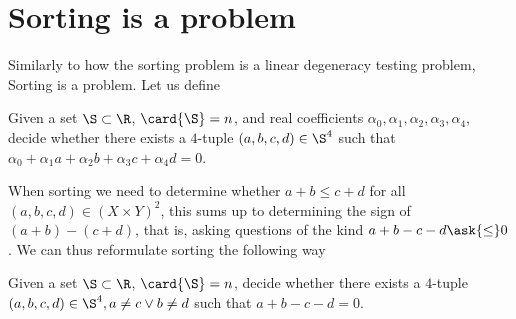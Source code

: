 \section{Sorting \XY is a \fourLDT problem}
\label{tree:related:xy4ldt}

Similarly to how the sorting problem is a linear degeneracy testing problem,
Sorting \XY is a \fourLDT problem. Let us define \fourLDT
\begin{problem}[\fourLDT]
Given a set $\S \subset \R$, $\card{\S} = n$, and real coefficients $\alpha_0,
\alpha_1, \alpha_2, \alpha_3, \alpha_4$, decide whether there exists a
\(4\)-tuple \((a,b,c,d) \in \S^4\) such that
$\alpha_0 + \alpha_1 a + \alpha_2 b + \alpha_3 c + \alpha_4 d = 0$.
\end{problem}

When sorting \XY we need to determine whether $a + b \le c + d$ for all
$(a,b,c,d) \in (X \times Y)^2$, this sums up to determining the sign of $(a+b) -
(c+d)$, that is, asking questions of the kind $a + b - c - d \ask{\le} 0$. We can thus
reformulate sorting \XY the following way
\begin{problem}
Given a set $\S \subset \R$, $\card{\S} = n$, decide whether there exists a
\(4\)-tuple \((a,b,c,d) \in \S^4, a \neq c \lor b \neq d\) such
that $a + b - c - d = 0$.
\end{problem}

